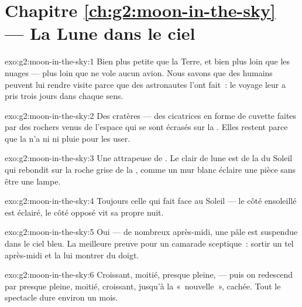 \section*{Chapitre \ref{ch:g2:moon-in-the-sky} --- La Lune dans le ciel}

\begin{solution}{exo:g2:moon-in-the-sky:1}
Bien plus petite que la Terre, et bien plus loin que les nuages ---
plus loin que ne vole aucun avion. Nous savons que des humains
peuvent lui rendre visite parce que des astronautes l'ont fait~: le
voyage leur a pris trois jours dans chaque sens.
\end{solution}

\begin{solution}{exo:g2:moon-in-the-sky:2}
Des cratères --- des cicatrices en forme de cuvette faites par des
rochers venus de l'espace qui se sont écrasés sur la . Elles
restent parce que la  n'a ni  ni pluie pour les user.
\end{solution}

\begin{solution}{exo:g2:moon-in-the-sky:3}
Une attrapeuse de . Le clair de lune est de la  du
Soleil qui rebondit sur la roche grise de la , comme un mur blanc
éclaire une pièce sans être une lampe.
\end{solution}

\begin{solution}{exo:g2:moon-in-the-sky:4}
Toujours celle qui fait face au Soleil --- le côté ensoleillé est
éclairé, le côté opposé vit sa propre nuit.
\end{solution}

\begin{solution}{exo:g2:moon-in-the-sky:5}
Oui --- de nombreux après-midi, une  pâle est suspendue dans le
ciel bleu. La meilleure preuve pour un camarade sceptique~: sortir un
tel après-midi et la lui montrer du doigt.
\end{solution}

\begin{solution}{exo:g2:moon-in-the-sky:6}
Croissant, moitié, presque pleine,  --- puis on redescend
par presque pleine, moitié, croissant, jusqu'à la  «~nouvelle~»,
cachée. Tout le spectacle dure environ un mois.
\end{solution}

